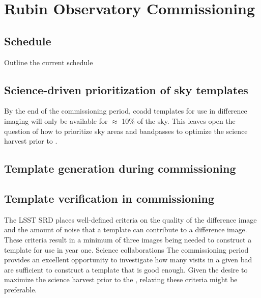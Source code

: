 \section{Rubin Observatory Commissioning} 
\label{sec:commissioning}

\subsection{Schedule}
Outline the current schedule 



\subsection{Science-driven prioritization of sky templates}
By the end of the commissioning period, coadd templates for use in difference imaging will only be available for $\approx$ 10\% of the sky. 
This leaves open the question of how to  prioritize  sky areas and bandpasses to optimize the science harvest prior to \drone.

\subsection{Template generation during commissioning}


\subsection{Template verification in commissioning}

The LSST SRD places well-defined criteria on the quality of the difference image and the amount of noise that a template can contribute to a difference image.  These criteria result in a minimum of three images being needed to construct a template for use in year one.  Science collaborations The commissioning period provides an excellent opportunity to investigate how many visits in a given bad are sufficient to construct a template that is good enough.  Given the desire to maximize the science harvest prior to the \drone,  relaxing these criteria might be preferable. 

